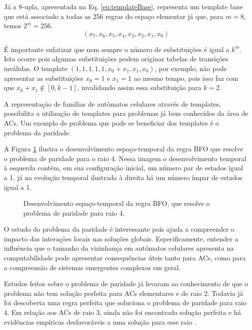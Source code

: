 Já a $8$-upla, apresentada na Eq. \eqref{eq:templateBase}, representa um template base que está associado a todas as 256 regras do espaço elementar já que, para $m = 8$, temos $2^m = 256 $.
\begin{equation}
(x_7,x_6,x_5,x_4,x_3,x_2,x_1,x_0)
\label{eq:templateBase}
\end{equation}

É importante enfatizar que nem sempre o número de substituições é igual a $k^m$. Isto ocorre pois algumas substituições podem originar tabelas de transições inválidas. O template $(1,1,1,1,1,x_0+x_1,x_1,x_0)$, por exemplo, não pode apresentar as substituições $x_0=1$ e $x_1=1$ ao mesmo tempo, pois isso faz com que $x_0 + x_1 \notin [0, k-1]$, invalidando assim essa substituição para $k=2$.

A representação de famílias de autômatos celulares através de templates, possibilita a utilização de templates para problemas já bem conhecidos da área de ACs. Um exemplo de problema que pode se beneficiar dos templates é o problema da paridade.

A Figura \ref{fig:parity-rule} ilustra o desenvolvimento espaço-temporal da regra BFO \cite{Betel2013} que resolve o problema de paridade para o raio 4. Nessa imagem o desenvolvimento temporal à esquerda contém, em sua configuração inicial, um número par de estados igual a 1, já na evolução temporal ilustrada à direita há um número ímpar de estados igual a 1.

\begin{figure}[h!]
\center
{}
\qquad
{}
\caption{Desenvolvimento espaço-temporal da regra BFO, que resolve o problema de paridade para raio 4. \cite{Betel2013}}
\label{fig:parity-rule}
\end{figure}

O estudo do problema da paridade é interessante pois ajuda a compreender o impacto das interações locais nas soluções globais. Especificamente, entender a influência que o tamanho da vizinhança em autômatos celulares apresenta na computabilidade pode apresentar consequências úteis tanto para ACs, como para a compreensão de sistemas emergentes complexos em geral.

Estudos feitos sobre o problema de paridade já levaram ao conhecimento de que o problema não tem solução perfeita para ACs elementares e de raio 2. Todavia já foi descoberta uma regra perfeita que soluciona o problema de paridade para raio 4. Em relação aos ACs de raio 3, ainda não foi encontrada solução perfeita e há evidências empíricas desfavoráveis a uma solução para esse raio \cite{Betel2013}.

